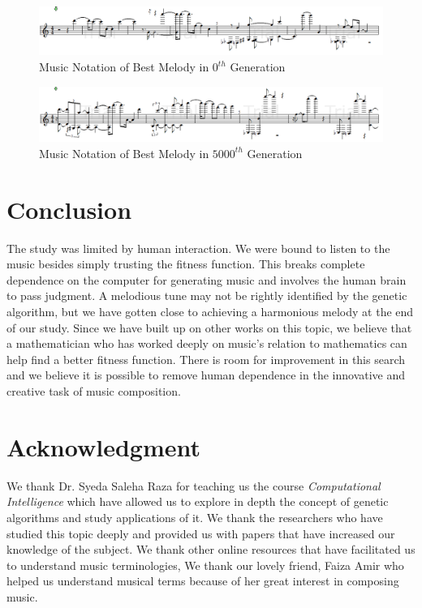 \documentclass[conference]{IEEEtran}
\begin{document}
\begin{figure}
\includegraphics[width=20 cm]{gen-0.png}
\caption{Music Notation of Best Melody in $0^{th}$ Generation}
\label{gen-0}
\end{figure}

\begin{figure}
\includegraphics[width=20 cm]{final.png}
\caption{Music Notation of Best Melody in $5000^{th}$ Generation}
\label{final}
\end{figure}


\section{Conclusion}
The study was limited by human interaction. We were bound to listen to the music besides simply trusting the fitness function. This breaks complete dependence on the computer for generating music and involves the human brain to pass judgment. A melodious tune may not be rightly identified by the genetic algorithm, but we have gotten close to achieving a harmonious melody at the end of our study. Since we have built up on other works on this topic, we believe that a mathematician who has worked deeply on music's relation to mathematics can help find a better fitness function. There is room for improvement in this search and we believe it is possible to remove human dependence in the innovative and creative task of music composition.

\section*{Acknowledgment}
We thank Dr. Syeda Saleha Raza for teaching us the course \textit{Computational Intelligence} which have allowed us to explore in depth the concept of genetic algorithms and study applications of it. We thank the researchers who have studied this topic deeply and provided us with papers that have increased our knowledge of the subject. We thank other online resources that have facilitated us to understand music terminologies, We thank our lovely friend, Faiza Amir who helped us understand musical terms because of her great interest in composing music.
\end{document}
